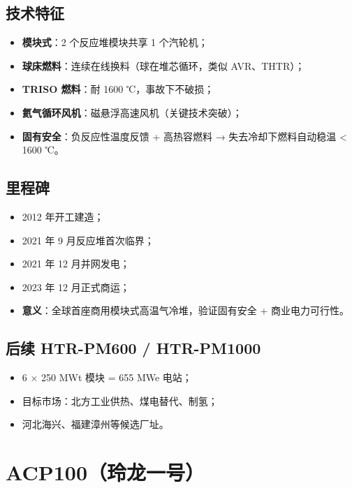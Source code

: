 \documentclass[
  UTF8,
  scheme=plain,
  fontsize=10pt,
  openany
]{ctexbook}
\begin{document}
\subsection{技术特征}\label{ux6280ux672fux7279ux5f81}

\begin{itemize}
\tightlist
\item
  \textbf{模块式}：2 个反应堆模块共享 1 个汽轮机；
\item
  \textbf{球床燃料}：连续在线换料（球在堆芯循环，类似 AVR、THTR）；
\item
  \textbf{TRISO 燃料}：耐 1600 ℃，事故下不破损；
\item
  \textbf{氦气循环风机}：磁悬浮高速风机（关键技术突破）；
\item
  \textbf{固有安全}：负反应性温度反馈 + 高热容燃料 →
  失去冷却下燃料自动稳温 \textless{} 1600 ℃。
\end{itemize}

\subsection{里程碑}\label{ux91ccux7a0bux7891}

\begin{itemize}
\tightlist
\item
  2012 年开工建造；
\item
  2021 年 9 月反应堆首次临界；
\item
  2021 年 12 月并网发电；
\item
  2023 年 12 月正式商运；
\item
  \textbf{意义}：全球首座商用模块式高温气冷堆，验证固有安全 +
  商业电力可行性。
\end{itemize}

\subsection{后续 HTR-PM600 /
HTR-PM1000}\label{ux540eux7eed-htr-pm600-htr-pm1000}

\begin{itemize}
\tightlist
\item
  6 × 250 MWt 模块 = 655 MWe 电站；
\item
  目标市场：北方工业供热、煤电替代、制氢；
\item
  河北海兴、福建漳州等候选厂址。
\end{itemize}

\section{ACP100（玲龙一号）}\label{acp100ux73b2ux9f99ux4e00ux53f7}
\end{document}

